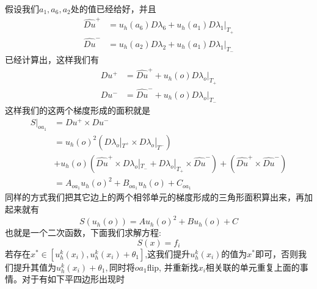\documentclass[11pt]{article}
\begin{document}
假设我们$a_1,a_6,a_2$处的值已经给好，并且
$$\begin{aligned}
\widehat{Du}^+&=u_h(a_6)D\lambda_6+u_h(a_1)D\lambda_1|_{T_+}\\
\widehat{Du}^-&=u_h(a_2)D\lambda_2+u_h(a_1)D\lambda_1|_{T_-}
\end{aligned}$$
已经计算出，这样我们有
$$\begin{aligned}
Du^+ &= \widehat{Du}^++u_h(o)D\lambda_o|_{T_+}\\
Du^-&=\widehat{Du}^-+u_h(o)D\lambda_o|_{T_-}
\end{aligned}$$
这样我们的这两个梯度形成的面积就是
$$\begin{aligned}
S|_{oa_1}&=Du^+\times Du^-\\
&= u_h(o)^2 \left(D\lambda_o|_{T^+}\times D\lambda _o|_{T^-}\right)\\
&+u_h(o)\left(\widehat{Du}^+\times D\lambda_o|_{T_-}+D\lambda_o|_{T_+}\times \widehat{Du}^-\right)+ (\widehat{Du}^+\times \widehat{Du}^-)\\
&= A_{oa_1}u_h(o)^2+B_{oa_1}u_h(o)+C_{oa_1}
\end{aligned}$$
同样的方式我们把其它边上的两个相邻单元的梯度形成的三角形面积算出来，再加起来就有
$$S(u_h(o)) = Au_h(o)^2+Bu_h(o)+C$$
也就是一个二次函数，下面我们求解方程:
$$S(x)=f_i$$若存在$x^*\in[u_h^{k}(x_i),u_h^{k}(x_i)+\theta_1]$,这我们提升$u_h^k(x_i)$的值为$x^*$即可，否则我们提升其值为$u_h^{k}(x_i)+\theta_1,$同时将$oa_1$flip, 并重新找$x_i$相关联的单元重复上面的事情。对于有如下平四边形出现时
\end{document}
